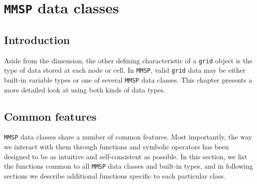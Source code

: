 
\chapter{{\tt MMSP} data classes}

\section{Introduction}
Aside from the dimension, the other defining characteristic of a {\tt grid} object is the type of data stored at each node or cell.  In {\tt MMSP}, valid {\tt grid} data may be either built-in variable types or one of several {\tt MMSP} data classes.  This chapter presents a more detailed look at using both kinds of data types.

\section{Common features}
{\tt MMSP} data classes share a number of common features.  Most importantly, the way we interact with them through functions and symbolic operators has been designed to be as intuitive and self-consistent as possible.  In this section, we list the functions common to all {\tt MMSP} data classes and built-in types, and in following sections we describe additional functions specific to each particular class.

